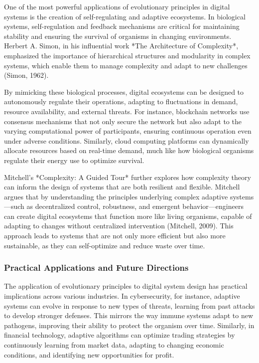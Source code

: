 \documentclass[12pt,twoside]{article}
\begin{document}
One of the most powerful applications of evolutionary principles in digital systems is the creation of self-regulating and adaptive ecosystems. In biological systems, self-regulation and feedback mechanisms are critical for maintaining stability and ensuring the survival of organisms in changing environments. Herbert A. Simon, in his influential work *The Architecture of Complexity*, emphasized the importance of hierarchical structures and modularity in complex systems, which enable them to manage complexity and adapt to new challenges (Simon, 1962).

By mimicking these biological processes, digital ecosystems can be designed to autonomously regulate their operations, adapting to fluctuations in demand, resource availability, and external threats. For instance, blockchain networks use consensus mechanisms that not only secure the network but also adapt to the varying computational power of participants, ensuring continuous operation even under adverse conditions. Similarly, cloud computing platforms can dynamically allocate resources based on real-time demand, much like how biological organisms regulate their energy use to optimize survival.

Mitchell’s *Complexity: A Guided Tour* further explores how complexity theory can inform the design of systems that are both resilient and flexible. Mitchell argues that by understanding the principles underlying complex adaptive systems—such as decentralized control, robustness, and emergent behavior—engineers can create digital ecosystems that function more like living organisms, capable of adapting to changes without centralized intervention (Mitchell, 2009). This approach leads to systems that are not only more efficient but also more sustainable, as they can self-optimize and reduce waste over time.

\subsubsection{Practical Applications and Future Directions}

The application of evolutionary principles to digital system design has practical implications across various industries. In cybersecurity, for instance, adaptive systems can evolve in response to new types of threats, learning from past attacks to develop stronger defenses. This mirrors the way immune systems adapt to new pathogens, improving their ability to protect the organism over time. Similarly, in financial technology, adaptive algorithms can optimize trading strategies by continuously learning from market data, adapting to changing economic conditions, and identifying new opportunities for profit.
\end{document}

